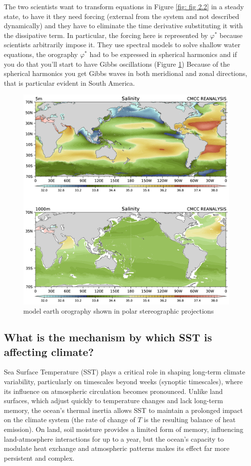 The two scientists want to transform equations in Figure \ref{fig: fig 2.2}  in a steady state, to have it they need forcing (external from the system and not described dynamically) and they have to eliminate the time derivative substituting it with the dissipative term.
In particular, the forcing here is represented by $\varphi^*$ because scientists arbitrarily impose it.
They use spectral models to solve shallow water equations, the orography $\varphi^*$ had to be expressed in spherical harmonics and if you do that you'll start to have Gibbs oscillations (Figure \ref{fig:fig 2.5})
Because of the spherical harmonics you get Gibbs waves in both meridional and zonal directions, that is particular evident in South America.
\begin{figure}[h!]
	\centering
	\includegraphics[width=0.5\linewidth]{uploads/26image.png}
	\caption{model earth orography shown in polar stereographic projections}
	\label{fig:fig 2.5}
\end{figure}


\subsection{What is the mechanism by which SST is affecting climate?}

Sea Surface Temperature (SST) plays a critical role in shaping long-term climate variability, particularly on timescales beyond weeks (synoptic timescales), where its influence on atmospheric circulation becomes pronounced. Unlike land surfaces, which adjust quickly to temperature changes and lack long-term memory, the ocean's thermal inertia allows SST to maintain a prolonged impact on the climate system (the rate of change of $T$ is the resulting balance of heat emission). On land, soil moisture provides a limited form of memory, influencing land-atmosphere interactions for up to a year, but the ocean’s capacity to modulate heat exchange and atmospheric patterns makes its effect far more persistent and complex.

